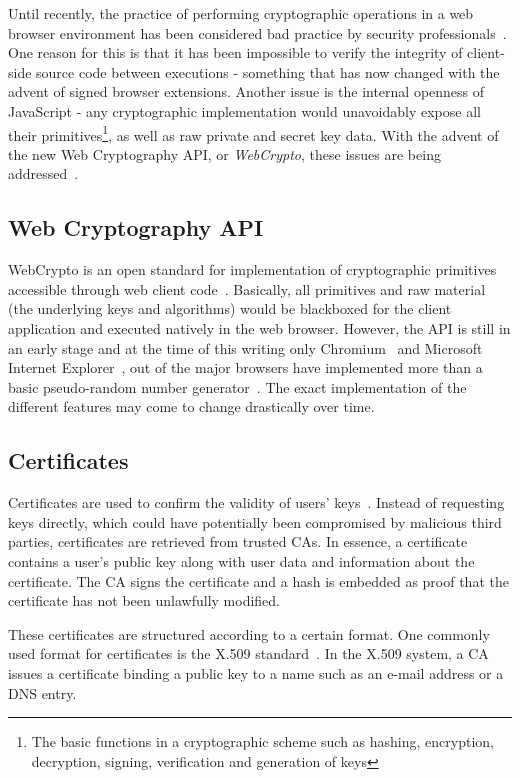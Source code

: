 Until recently, the practice of performing cryptographic operations in a web browser environment has been considered bad practice by security professionals~\cite{Matasano:Online}. One reason for this is that it has been impossible to verify the integrity of client-side source code between executions - something that has now changed with the advent of signed browser extensions. Another issue is the internal openness of JavaScript - any cryptographic implementation would unavoidably expose all their primitives\footnote{The basic functions in a cryptographic scheme such as hashing, encryption, decryption, signing, verification and generation of keys}, as well as raw private and secret key data. With the advent of the new Web Cryptography API, or \emph{WebCrypto}, these issues are being addressed~\cite{WebCrypto:Online}.

\subsection{Web Cryptography API}
WebCrypto is an open standard for implementation of cryptographic primitives accessible through web client code~\cite{WebCrypto:Online}. Basically, all primitives and raw material (the underlying keys and algorithms) would be blackboxed for the client application and executed natively in the web browser. However, the API is still in an early stage and at the time of this writing only Chromium~\cite{ImplementedChromium:Online} and Microsoft Internet Explorer~\cite{WCAImplementationMicrosoft:Online}, out of the major browsers have implemented more than a basic pseudo-random number generator~\cite{WCAImplementationMozilla:Online}. The exact implementation of the different features may come to change drastically over time.

\subsection{Certificates}
Certificates are used to confirm the validity of users' keys~\cite{EETimesCrypto:Online}. Instead of requesting keys directly, which could have potentially been compromised by malicious third parties, certificates are retrieved from trusted CAs. In essence, a certificate contains a user's public key along with user data and information about the certificate. The CA signs the certificate and a hash is embedded as proof that the certificate has not been unlawfully modified.

These certificates are structured according to a certain format. One commonly used format for certificates is the X.509 standard~\cite{IETFX509:Online}. In the X.509 system, a CA issues a certificate binding a public key to a name such as an e-mail address or a DNS entry.

